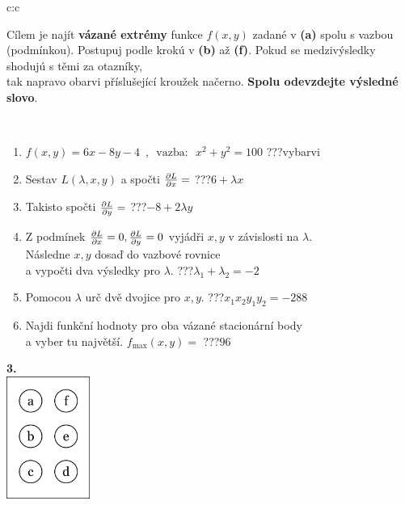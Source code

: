 \documentclass[10pt]{report}
\begin{document}
\begin{tabular}{c:c}
\begin{minipage}[c][104.5mm][t]{0.5\linewidth}
\begin{center}
\begin{minipage}{0.95\linewidth}
\begin{center}
Cílem je najít \textbf{vázané extrémy} funkce $f(x,y)$ zadané v \textbf{(a)} spolu s vazbou (podmínkou). Postupuj podle krokú v \textbf{(b)} až \textbf{(f)}. Pokud se medzivýsledky shodujú s těmi za otazníky,\\tak napravo obarvi příslušející kroužek načerno. \textbf{Spolu odevzdejte výsledné slovo}.
\end{center}
\end{minipage}
\\[1mm]
\begin{minipage}{0.79\linewidth}
\begin{center}
\begin{varwidth}{\linewidth}
\begin{enumerate}
\normalsize
\item $f(x,y)=6x-8y-4 \enspace , \enspace \mathrm{vazba:} \enspace x^2+y^2=100$\quad \dotfill\; ???\;\dotfill \quad vybarvi
\item Sestav $L(\lambda,x,y)$ a spočti $\pdv{L}{x}=$\quad \dotfill\; ???\;\dotfill \quad $6+\lambda x$
\item Takisto spočti $\pdv{L}{y}=$\quad \dotfill\; ???\;\dotfill \quad $-8+2\lambda y$
\item Z podmínek $\pdv{L}{x}=0 , \pdv{L}{y}=0$ vyjádři $x,y$ v závislosti na $\lambda$.\\ \phantom{xxxxxx}Následne $x,y$ dosaď do vazbové rovnice\\ \phantom{xxxxxx}a vypočti dva výsledky pro $\lambda$.\quad \dotfill\; ???\;\dotfill \quad $\lambda_1+\lambda_2=-2$
\item Pomocou $\lambda$ urč dvě dvojice pro $x,y$.\quad \dotfill\; ???\;\dotfill \quad $x_1 x_2 y_1 y_2=-288$
\item Najdi funkční hodnoty pro oba vázané stacionární body\\ \phantom{xxxxxx}a vyber tu najvětší. $f_{\text{max}}(x,y)=$\quad \dotfill\; ???\;\dotfill \quad $96$
\end{enumerate}
\end{varwidth}
\end{center}
\end{minipage}
\begin{minipage}{0.20\linewidth}
\begin{center}
{\Huge\bfseries 3.} \\[2mm]
\includegraphics[height=40mm]{../images/braille.png}

\end{center}
\end{minipage}
\end{center}
\end{minipage}
\end{tabular}
\end{document}
